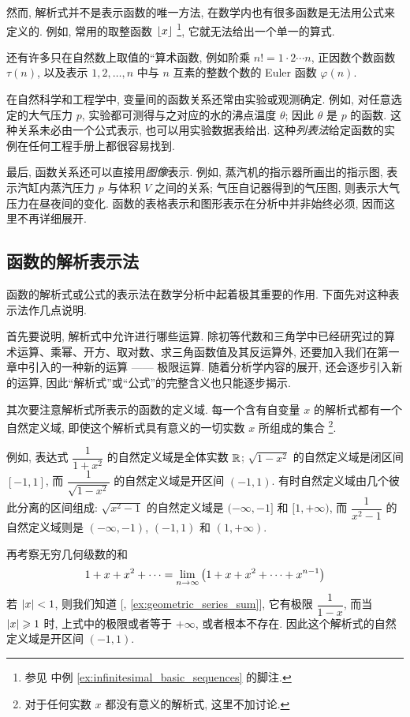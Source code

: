 然而, 解析式并不是表示函数的唯一方法, 在数学内也有很多函数是无法用公式来定义的.
例如, 常用的取整函数 $\left\lfloor x \right\rfloor$
\footnote{参见  中例 \ref{ex:infinitesimal_basic_sequences} 的脚注.},
它就无法给出一个单一的算式.

还有许多只在自然数上取值的“算术函数,
例如阶乘 $n!=1\cdot2\cdots n$,
正因数个数函数 $\tau(n)$,
以及表示 $1,2,\ldots,n$ 中与 $n$ 互素的整数个数的 Euler 函数 $\varphi(n)$.

在自然科学和工程学中, 变量间的函数关系还常由实验或观测确定.
例如, 对任意选定的大气压力 $p$, 实验都可测得与之对应的水的沸点温度 $\theta$;
因此 $\theta$ 是 $p$ 的函数.
这种关系未必由一个公式表示, 也可以用实验数据表给出.
这种\emph{列表法}给定函数的实例在任何工程手册上都很容易找到.

最后, 函数关系还可以直接用\emph{图像}表示.
例如, 蒸汽机的指示器所画出的指示图,
表示汽缸内蒸汽压力 $p$ 与体积 $V$ 之间的关系;
气压自记器得到的气压图, 则表示大气压力在昼夜间的变化.
函数的表格表示和图形表示在分析中并非始终必须,
因而这里不再详细展开.

\subsection{函数的解析表示法}\label{subsec:46}
函数的解析式或公式的表示法在数学分析中起着极其重要的作用.
下面先对这种表示法作几点说明.

\myrefparagraph{1\textdegree}\label{par:analytic_operations}
首先要说明, 解析式中允许进行哪些运算.
除初等代数和三角学中已经研究过的算术运算、乘幂、开方、取对数、求三角函数值及其反运算外,
还要加入我们在第一章中引入的一种新的运算 —— 极限运算.
随着分析学内容的展开, 还会逐步引入新的运算,
因此“解析式”或“公式”的完整含义也只能逐步揭示.

\myrefparagraph{2\textdegree}\label{par:natural_domain}
其次要注意解析式所表示的函数的定义域.
每一个含有自变量 $x$ 的解析式都有一个自然定义域,
即使这个解析式具有意义的一切实数 $x$ 所组成的集合
\footnote{对于任何实数 $x$ 都没有意义的解析式, 这里不加讨论.}.

例如, 表达式 $\dfrac{1}{1+x^2}$ 的自然定义域是全体实数 $\mathbb{R}$;
$\sqrt{1-x^2}$ 的自然定义域是闭区间 $[-1,1]$,
而 $\dfrac{1}{\sqrt{1-x^2}}$ 的自然定义域是开区间 $(-1,1)$.
有时自然定义域由几个彼此分离的区间组成:
$\sqrt{x^2-1}$ 的自然定义域是 $(-\infty,-1]$ 和 $[1,+\infty)$,
而 $\dfrac{1}{x^2-1}$ 的自然定义域则是 $(-\infty,-1)$, $(-1,1)$ 和 $(1,+\infty)$.

再考察无穷几何级数的和
$$
1+x+x^2+\cdots
=\lim_{n\to\infty}\left( 1+x+x^2+\cdots+x^{n-1} \right)
$$
若 $\left| x \right|<1$, 则我们知道 [, \ref{ex:geometric_series_sum}],
它有极限 $\dfrac{1}{1-x}$,
而当 $\left| x \right|\geqslant1$ 时, 上式中的极限或者等于 $+\infty$, 或者根本不存在.
因此这个解析式的自然定义域是开区间 $(-1,1)$.

